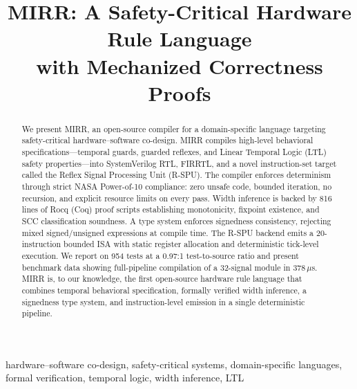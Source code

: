 \documentclass[conference]{IEEEtran}
\begin{document}
\title{MIRR: A Safety-Critical Hardware Rule Language\\with Mechanized Correctness Proofs}

\author{
}

\maketitle

\begin{abstract}
We present MIRR, an open-source compiler for a domain-specific language
targeting safety-critical hardware--software co-design.  MIRR compiles
high-level behavioral specifications---temporal guards, guarded reflexes,
and Linear Temporal Logic (LTL) safety properties---into SystemVerilog RTL,
FIRRTL, and a novel instruction-set target called the Reflex Signal
Processing Unit (R-SPU).  The compiler enforces determinism through strict
NASA Power-of-10 compliance: zero unsafe code, bounded iteration, no
recursion, and explicit resource limits on every pass.  Width inference is
backed by 816 lines of Rocq (Coq) proof scripts establishing monotonicity,
fixpoint existence, and SCC classification soundness.  A type system
enforces signedness consistency, rejecting mixed signed/unsigned
expressions at compile time.  The R-SPU backend emits a 20-instruction
bounded ISA with static register allocation and deterministic tick-level
execution.  We report on 954 tests at a 0.97:1 test-to-source ratio and
present benchmark data showing full-pipeline compilation of a 32-signal
module in 378\,$\mu$s.  MIRR is, to our knowledge, the first open-source
hardware rule language that combines temporal behavioral specification,
formally verified width inference, a signedness type system, and
instruction-level emission in a single deterministic pipeline.
\end{abstract}

\begin{IEEEkeywords}
hardware--software co-design, safety-critical systems, domain-specific
languages, formal verification, temporal logic, width inference, LTL
\end{IEEEkeywords}
\end{document}
